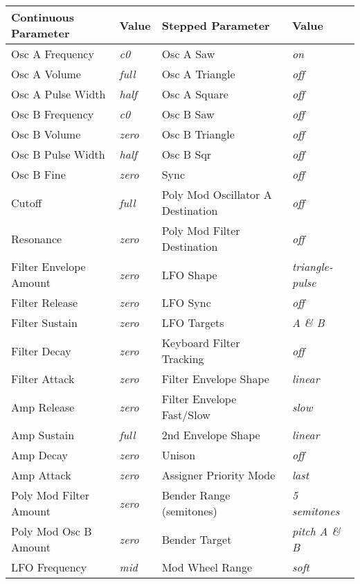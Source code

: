 \begin{longtable}[l]{p{5cm}|p{5cm}|p{5cm}|p{5cm}|} 
\textbf{Continuous Parameter} & \textbf{Value} & \textbf{Stepped Parameter} & \textbf{Value} \\ \hline
Osc A Frequency & \textit{c0} & Osc A Saw & \textit{on} \\ \hline
Osc A Volume & \textit{full} & Osc A Triangle &\textit{off} \\ \hline
Osc A Pulse Width & \textit{half} & Osc A Square & \textit{off} \\ \hline
Osc B Frequency & \textit{c0} & Osc B Saw & \textit{off} \\ \hline
Osc B Volume & \textit{zero} & Osc B Triangle & \textit{off} \\ \hline
Osc B Pulse Width & \textit{half} & Osc B Sqr &\textit{off} \\ \hline
Osc B Fine & \textit{zero} & Sync & \textit{off} \\ \hline
Cutoff & \textit{full} & Poly Mod Oscillator A Destination & \textit{off} \\ \hline
Resonance & \textit{zero} & Poly Mod Filter Destination & \textit{off} \\ \hline
Filter Envelope Amount & \textit{zero} & LFO Shape & \textit{triangle-pulse} \\ \hline
Filter Release & \textit{zero} & LFO Sync & \textit{off} \\ \hline
Filter Sustain & \textit{zero} & LFO Targets & \textit{A \& B} \\ \hline
Filter Decay & \textit{zero} & Keyboard Filter Tracking & \textit{off} \\ \hline
Filter Attack & \textit{zero} & Filter Envelope Shape & \textit{linear} \\ \hline
Amp Release & \textit{zero} & Filter Envelope Fast/Slow & \textit{slow} \\ \hline
Amp Sustain & \textit{full} & 2nd Envelope Shape & \textit{linear} \\ \hline
Amp Decay & \textit{zero} & Unison & \textit{off} \\ \hline
Amp Attack & \textit{zero} & Assigner Priority Mode & \textit{last} \\ \hline
Poly Mod Filter Amount & \textit{zero} & Bender Range (semitones) & \textit{5 semitones} \\ \hline
Poly Mod Osc B Amount & \textit{zero} & Bender Target & \textit{pitch A \& B} \\ \hline
LFO Frequency & \textit{mid} & Mod Wheel Range & \textit{soft} \\ \hline

\end{longtable}
